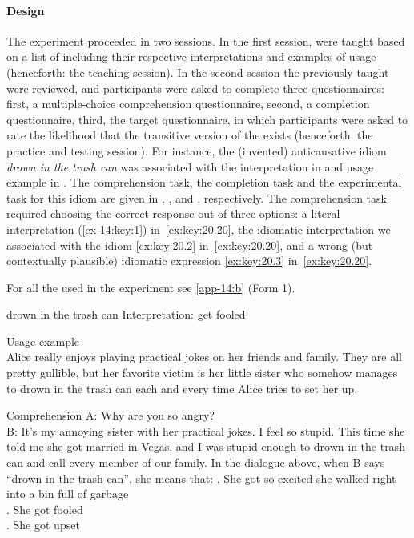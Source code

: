 \documentclass[output=paper]{langsci/langscibook}
\begin{document}
\largerpage
\paragraph*{Design} The experiment proceeded in two sessions. In the first
session,  were taught based on a list of  including their
respective interpretations and examples of usage (henceforth: the teaching
session). In the second session the  previously taught were reviewed, and
participants were asked to complete three questionnaires: first, a multiple-choice
comprehension questionnaire, second, a completion questionnaire, third, the
target questionnaire, in which participants were asked to rate the likelihood
that the transitive version of the  exists (henceforth: the practice and
testing session). For instance, the (invented) anticausative idiom \emph{drown
in the trash can}  was associated with the interpretation in
 and usage example in .  The comprehension
task, the completion task and the experimental task for this idiom are
given in , , and ,
respectively. The comprehension task required choosing the correct response out
of three options: a literal interpretation (\ref{ex-14:key:1}) in~\eqref{ex:key:20.20}, the
idiomatic interpretation we associated with the idiom
\eqref{ex:key:20.2}
in~\eqref{ex:key:20.20}, and a wrong (but contextually plausible) idiomatic
expression \eqref{ex:key:20.3} in~\eqref{ex:key:20.20}.

For all the  used in the experiment see \ref{app-14:b} (Form 1).

\ea\label{ex:key:20.18}
    \ea\label{ex:key:20.18a} drown in the trash can
    \ex\label{ex:key:20.18b} Interpretation: get fooled
    \z
\z

\ea\label{ex:key:20.19}Usage example\\
    Alice really enjoys playing practical jokes on her friends and family. They
    are all pretty gullible, but her favorite victim is her little sister who
    somehow manages to drown in the trash can each and every time Alice tries
    to set her up.
\z

\ea\label{ex:key:20.20}Comprehension
    \sn A: Why are you so angry?\\
        B: It's my annoying sister with her practical jokes.  I feel so stupid.
        This time she told me she got married in Vegas, and I was stupid enough
        to drown in the trash can and call every member of our family.
    \sn In the dialogue above, when B says \enquote{drown in the trash
        can}, she means that:
    . She got so excited she walked right into a bin full of garbage\\
    . She got fooled\\
    . She got upset
\z
\end{document}
